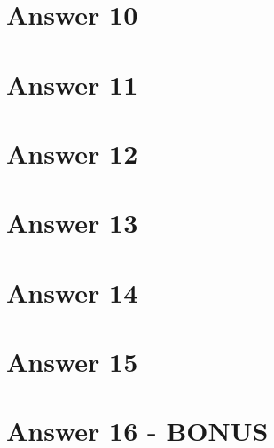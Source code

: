 \documentclass[12pt]{article}
\begin{document}
\section*{Answer 10}

\section*{Answer 11}

\section*{Answer 12}

\section*{Answer 13}

\section*{Answer 14}

\section*{Answer 15}

\section*{Answer 16 - BONUS}
\end{document}
